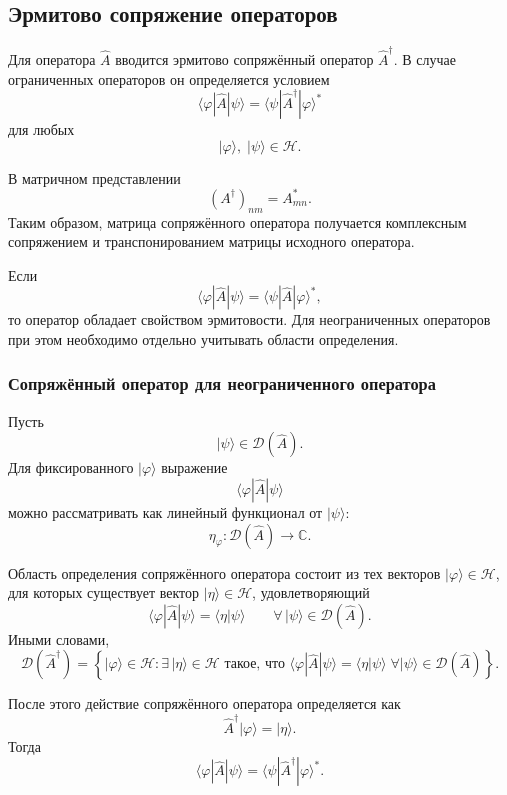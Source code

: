 \documentclass[12pt,a4paper]{article}
\begin{document}
\subsection{Эрмитово сопряжение операторов}

Для оператора $\hat A$ вводится эрмитово сопряжённый оператор
$\hat A^\dagger$. В случае ограниченных операторов он определяется
условием
\[
    \boxed{
    \langle\varphi|\hat A|\psi\rangle
    =
    \langle\psi|\hat A^\dagger|\varphi\rangle^*
    }
\]
для любых
\[
    |\varphi\rangle,\;|\psi\rangle\in\mathcal H.
\]

В матричном представлении
\[
    \boxed{
        (A^\dagger)_{nm}
        =
        A_{mn}^*
    }.
\]
Таким образом, матрица сопряжённого оператора получается комплексным
сопряжением и транспонированием матрицы исходного оператора.

Если
\[
    \langle\varphi|\hat A|\psi\rangle
    =
    \langle\psi|\hat A|\varphi\rangle^*,
\]
то оператор обладает свойством эрмитовости. Для неограниченных
операторов при этом необходимо отдельно учитывать области определения.

\subsubsection{Сопряжённый оператор для неограниченного оператора}

Пусть
\[
    |\psi\rangle\in\mathcal D(\hat A).
\]
Для фиксированного $|\varphi\rangle$ выражение
\[
    \langle\varphi|\hat A|\psi\rangle
\]
можно рассматривать как линейный функционал от $|\psi\rangle$:
\[
    \eta_\varphi:
    \mathcal D(\hat A)\to\mathbb C.
\]

Область определения сопряжённого оператора состоит из тех векторов
$|\varphi\rangle\in\mathcal H$, для которых существует вектор
$|\eta\rangle\in\mathcal H$, удовлетворяющий
\[
    \boxed{
    \langle\varphi|\hat A|\psi\rangle
    =
    \langle\eta|\psi\rangle
    \qquad
    \forall\,|\psi\rangle\in\mathcal D(\hat A)
    }.
\]
Иными словами,
\[
\boxed{
\mathcal D(\hat A^\dagger)
=
\left\{
|\varphi\rangle\in\mathcal H:
\exists\,|\eta\rangle\in\mathcal H
\text{ такое, что }
\langle\varphi|\hat A|\psi\rangle
=
\langle\eta|\psi\rangle
\;
\forall|\psi\rangle\in\mathcal D(\hat A)
\right\}
}.
\]

После этого действие сопряжённого оператора определяется как
\[
    \boxed{
        \hat A^\dagger|\varphi\rangle
        =
        |\eta\rangle
    }.
\]
Тогда
\[
    \boxed{
    \langle\varphi|\hat A|\psi\rangle
    =
    \langle\psi|\hat A^\dagger|\varphi\rangle^*
    }.
\]
\end{document}

